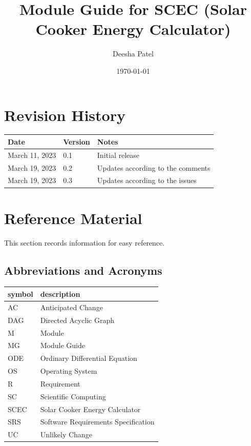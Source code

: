 \documentclass[12pt, titlepage]{article}
\begin{document}
\title{Module Guide for SCEC (Solar Cooker Energy Calculator)}
 
\author{Deesha Patel}
\date{\today}

\maketitle


\section{Revision History}

\begin{tabularx}{\textwidth}{p{3cm}p{2cm}X}
\toprule {\bf Date} & {\bf Version} & {\bf Notes}\\
\midrule
March 11, 2023 & 0.1 & Initial release\\
March 19, 2023 & 0.2 & Updates according to the comments \\ 
March 19, 2023 & 0.3 & Updates according to the issues \\ 
\bottomrule
\end{tabularx}

\newpage

\section{Reference Material}

This section records information for easy reference.

\subsection{Abbreviations and Acronyms}

\renewcommand{\arraystretch}{1.2}
\begin{tabular}{l l} 
  \toprule		
  \textbf{symbol} & \textbf{description}\\
  \midrule 
  AC & Anticipated Change\\
  DAG & Directed Acyclic Graph \\
  M & Module \\
  MG & Module Guide \\
  ODE & Ordinary Differential Equation \\ 
  OS & Operating System \\
  R & Requirement\\
  SC & Scientific Computing \\
  SCEC & Solar Cooker Energy Calculator\\
  SRS & Software Requirements Specification\\
  UC & Unlikely Change \\
  \bottomrule
\end{tabular}\\
\end{document}
